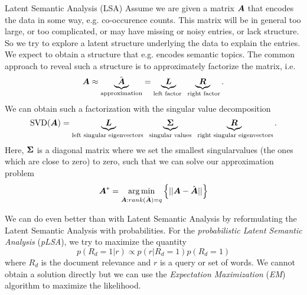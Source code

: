 \begin{topic}{0.3cm}{Latent Semantic Analysis (LSA)}
	Assume we are given a matrix \ensuremath{\mat{A}} that encodes the data in some way, e.g. co-occurence counts. %
	This matrix will be in general too large, or too complicated, or may have missing or noisy entries, or lack structure. %
	So we try to explore a latent structure underlying the data to explain the entries. %
	We expect to obtain a structure that e.g. encodes semantic topics. %
	The common approach to reveal such a structure is to approximately factorize the matrix, i.e. %
	\begin{equation}
		\mat{A} \approx \underbrace{\tilde{\mat{A}}}_{\text{approximation}} = \underbrace{\mat{L}}_{\text{left factor }} \underbrace{\mat{R}}_{\text{ right factor}}. %
	\end{equation}
	We can obtain such a factorization with the singular value decomposition %
	\begin{equation}
		\mathrm{SVD}(\mat{A}) = \underbrace{\mat{L}}_{\text{left singular eigenvectors }} \underbrace{\mat{\Sigma}}_{\text{ singular values }} \underbrace{\mat{R}}_{\text{ right singular eigenvectors}}. %
	\end{equation}
	Here, \ensuremath{\mat{\Sigma}} is a diagonal matrix where we set the smallest singularvalues (the ones which are close to zero) to zero, such that we can solve our approximation problem %
	\begin{equation}
		\boldsymbol{A}^* = \underset{ \hat{\boldsymbol{A}}:rank(\hat{\boldsymbol{A}}) = q }{ \arg\min } \left\{ || \boldsymbol{A} - \hat{\boldsymbol{A}} || \right\}
	\end{equation}
\end{topic}
We can do even better than with Latent Semantic Analysis by reformulating the Latent Semantic Analysis with probabilities. %
For the \emph{probabilistic Latent Semantic Analysis} (\emph{pLSA}), we try to maximize the quantity %
\begin{equation}
	p(R_d = 1|r) \propto p(r|R_d = 1) p(R_d=1)
\end{equation}
where \ensuremath{R_d} is the document relevance and \ensuremath{r} is a query or set of words. %
We cannot obtain a solution directly but we can use the \emph{Expectation Maximization} (\emph{EM}) algorithm to maximize the likelihood. %
%
%
%